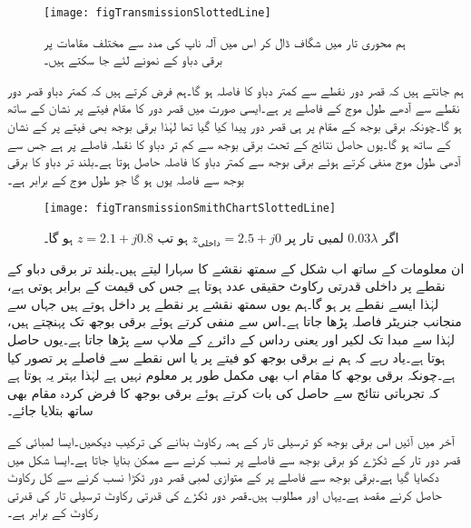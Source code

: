 \begin{figure}
\centering
\texttt{[image: figTransmissionSlottedLine]}
\caption{ہم محوری تار میں شگاف ڈال کر اس میں آلہ ناپ کی مدد سے مختلف مقامات پر برقی دباو  کے نمونے لئے جا سکتے ہیں۔}
\label{شکل_ترسیلی_ہم_محوری_شگاف_دار}
\end{figure}
ہم جانتے ہیں کہ قصر دور نقطے سے کمتر دباو کا فاصلہ  ہو گا۔ہم فرض کرتے ہیں کہ کمتر دباو قصر دور نقطے سے آدھے طول موج کے فاصلے پر ہے۔ایسی صورت میں قصر دور کا مقام فیتے پر  نشان کے ساتھ ہو گا۔چونکہ برقی بوجھ کے مقام پر ہی قصر دور پیدا کیا گیا تھا لہٰذا برقی بوجھ بھی فیتے پر  کے نشان کے ساتھ ہو گا۔یوں حاصل نتائج کے تحت برقی بوجھ سے کم تر دباو کا نقطہ  فاصلے پر ہے جس سے آدھی طول موج منفی کرتے ہوئے برقی بوجھ سے کمتر دباو کا فاصلہ  حاصل ہوتا ہے۔بلند تر دباو کا برقی بوجھ سے فاصلہ یوں
  ہو گا جو  طول موج کے برابر ہے۔
\begin{figure}
\centering
\texttt{[image: figTransmissionSmithChartSlottedLine]}
\caption{اگر $0.03\lambda$ لمبی تار پر $z_{\text{داخلی}}=2.5+j0$ ہو تب $z=2.1+j0.8$ ہو گا۔}
\label{شکل_ترسیلی_ہم_محوری_تجرباتی_نتائج}
\end{figure}

ان معلومات کے ساتھ اب شکل  کے سمتھ نقشے کا سہارا لیتے ہیں۔بلند تر برقی دباو کے نقطے پر  داخلی قدرتی رکاوٹ حقیقی عدد ہوتا ہے جس کی قیمت  کے برابر ہوتی ہے، لہٰذا ایسے نقطے پر  ہو گا۔ہم یوں سمتھ نقشے پر  نقطے پر داخل ہوتے ہیں جہاں سے منجانب جنریٹر فاصلہ  پڑھا جاتا ہے۔اس سے  منفی کرتے ہوئے  برقی بوجھ تک پہنچتے ہیں، لہٰذا  سے مبدا تک لکیر اور  یعنی      رداس کے دائرے کے ملاپ سے  پڑھا جاتا ہے۔یوں  حاصل ہوتا ہے۔یاد رہے کہ ہم نے برقی بوجھ کو فیتے پر  یا اس نقطے سے  فاصلے پر تصور کیا ہے۔چونکہ برقی بوجھ کا مقام اب بھی مکمل طور پر معلوم نہیں ہے لہٰذا بہتر یہ ہوتا ہے کہ تجرباتی نتائج سے حاصل  کی بات کرتے ہوئے برقی بوجھ کا فرض کردہ مقام بھی ساتھ بتلایا جائے۔

آخر میں آئیں اس برقی بوجھ کو  ترسیلی تار کے ہمہ رکاوٹ بنانے کی ترکیب دیکھیں۔ایسا  لمبائی کے قصر دور تار کے ٹکڑے کو برقی بوجھ سے  فاصلے پر نسب کرنے سے ممکن بنایا جاتا ہے۔ایسا شکل  میں دکھایا گیا ہے۔برقی بوجھ سے  فاصلے پر  کے متوازی  لمبی قصر دور ٹکڑا نسب کرنے سے کل رکاوٹ  حاصل کرنے مقصد ہے۔یہاں  اور  مطلوب ہیں۔قصر دور ٹکڑے کی قدرتی رکاوٹ ترسیلی تار کی قدرتی رکاوٹ  کے برابر ہے۔ 

